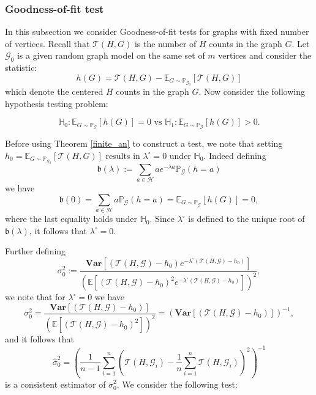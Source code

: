 \documentclass[12pt]{article}
\def\P{\mathbb{P}}
\def\E{\mathbb{E}}
\def\H{\mathbb{H}}
\numberwithin{equation}{section}
\begin{document}
\subsubsection{Goodness-of-fit test}{\label{GOF_finite}}

In this subsection we consider Goodness-of-fit tests for graphs with fixed number of vertices. Recall that $\mathcal{T}(H,G)$ is the number of $H$ counts in the graph $G$. Let
$\mathcal{G}_0$ is a given random graph model on the same set of $m$ vertices and consider the statistic:
$$h(G)= \mathcal{T}(H,G)-\E_{G\sim \P_{\mathcal{G}_0}}[\mathcal{T}(H,G)]$$
which denote the centered \(H\) counts in the graph $G$.
Now consider the following hypothesis testing problem:

\begin{equation}
\H_0: \mathbb{E}_{G\sim\mathbb{P}_{\mathcal{G}}}[h(G)]=0 \text{ vs } \H_1: \mathbb{E}_{G\sim\mathbb{P}_{\mathcal{G}}}[h(G)]> 0. 
\end{equation}

Before using Theorem \ref{finite_an} to construct a test, we note that setting 
$h_0=\E_{G\sim \P_{\mathcal{G}_0}}[\mathcal{T}(H,G)]$
results in $\lambda^{\circ}=0$ under $\H_0$. Indeed 
defining $$\mathfrak{b}(\lambda):=\sum_{a\in \mathcal{H}}a e^{-\lambda a}\mathbb{P}_{\mathcal{G}}(h=a)$$
we have
$$\mathfrak{b}(0)=\sum_{a\in \mathcal{H}}a\mathbb{P}_{\mathcal{G}}(h=a)=\mathbb{E}_{G\sim\mathbb{P}_{\mathcal{G}}}[h(G)]=0,$$
where the last equality holds under $\H_0$. Since $\lambda^{\circ}$ is defined to the unique root of $\mathfrak{b}(\lambda)$, it follows that $\lambda^{\circ}=0$. 

Further defining 
\[\sigma^2_0:=\frac{\mathbf{Var}\left[(\mathcal{T}(H,\mathcal{G})-h_0)e^{-\lambda^{\circ}(\mathcal{T}(H,\mathcal{G})-h_0)}\right]}{\left(\mathbb{E}\left[(\mathcal{T}(H,\mathcal{G})-h_0)^2e^{-\lambda^{\circ}(\mathcal{T}(H,\mathcal{G})-h_0)}\right]\right)^2},\]
we note that for $\lambda^{\circ}=0$ we have
\[\sigma^2_0=\frac{\mathbf{Var}\left[(\mathcal{T}(H,\mathcal{G})-h_0)\right]}{\left(\mathbb{E}\left[(\mathcal{T}(H,\mathcal{G})-h_0)^2\right]\right)^2}=(\mathbf{Var}\left[(\mathcal{T}(H,\mathcal{G})-h_0)\right])^{-1},\]
and it follows that 
\[\hat{\sigma}^2_0=\left(\frac{1}{n-1}\sum_{i=1}^n\left(\mathcal{T}(H,\mathcal{G}_i)-\frac{1}{n}\sum_{i=1}^n\mathcal{T}(H,\mathcal{G}_i)\right)^2\right)^{-1}\]
is a consistent estimator of $\sigma^2_0$. We consider the following test:
\end{document}
